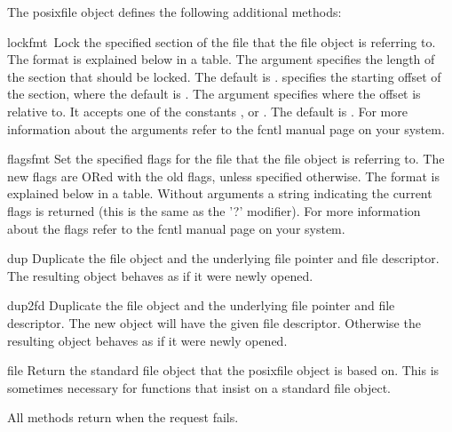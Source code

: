 The posixfile object defines the following additional methods:

\renewcommand{\indexsubitem}{(posixfile method)}
\begin{funcdesc}{lock}{fmt\, }
 Lock the specified section of the file that the file object is
 referring to.  The format is explained
 below in a table.  The  argument specifies the length of the
 section that should be locked. The default is . 
 specifies the starting offset of the section, where the default is
 .  The  argument specifies where the offset is
 relative to. It accepts one of the constants ,
  or .  The default is .
 For more information about the arguments refer to the fcntl
 manual page on your system.
\end{funcdesc}

\begin{funcdesc}{flags}{fmt}
 Set the specified flags for the file that the file object is referring
 to.  The new flags are ORed with the old flags, unless specified
 otherwise.  The format is explained below in a table.  Without
 arguments a string indicating the current flags is returned (this is
 the same as the '?' modifier).  For more information about the flags
 refer to the fcntl manual page on your system.
\end{funcdesc}

\begin{funcdesc}{dup}{}
 Duplicate the file object and the underlying file pointer and file
 descriptor.  The resulting object behaves as if it were newly
 opened.
\end{funcdesc}

\begin{funcdesc}{dup2}{fd}
 Duplicate the file object and the underlying file pointer and file
 descriptor.  The new object will have the given file descriptor.
 Otherwise the resulting object behaves as if it were newly opened.
\end{funcdesc}

\begin{funcdesc}{file}{}
 Return the standard file object that the posixfile object is based
 on.  This is sometimes necessary for functions that insist on a
 standard file object.
\end{funcdesc}

All methods return  when the request fails.

